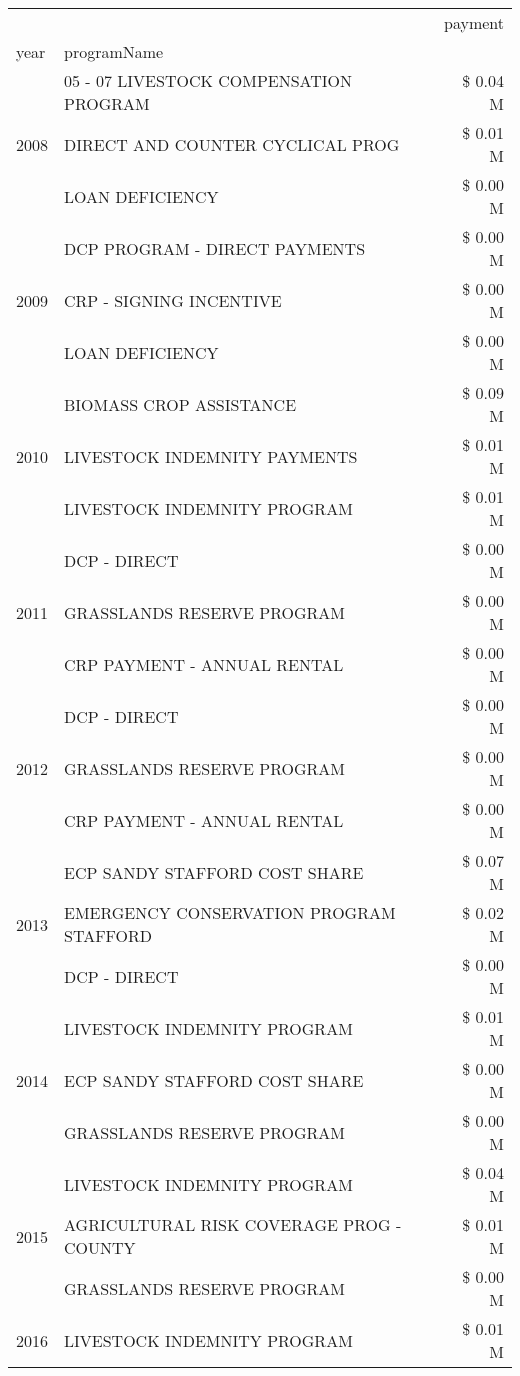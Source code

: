 \begin{tabular}{llr}
\toprule
 &  & payment \\
year & programName &  \\
\midrule
\multirow[t]{3}{*}{2008} & 05 - 07 LIVESTOCK COMPENSATION PROGRAM & \$ 0.04 M \\
 & DIRECT AND COUNTER CYCLICAL PROG & \$ 0.01 M \\
 & LOAN DEFICIENCY & \$ 0.00 M \\
\cline{1-3}
\multirow[t]{3}{*}{2009} & DCP PROGRAM - DIRECT PAYMENTS & \$ 0.00 M \\
 & CRP - SIGNING INCENTIVE & \$ 0.00 M \\
 & LOAN DEFICIENCY & \$ 0.00 M \\
\cline{1-3}
\multirow[t]{3}{*}{2010} & BIOMASS CROP ASSISTANCE & \$ 0.09 M \\
 & LIVESTOCK INDEMNITY PAYMENTS & \$ 0.01 M \\
 & LIVESTOCK INDEMNITY PROGRAM & \$ 0.01 M \\
\cline{1-3}
\multirow[t]{3}{*}{2011} & DCP - DIRECT & \$ 0.00 M \\
 & GRASSLANDS RESERVE PROGRAM & \$ 0.00 M \\
 & CRP PAYMENT - ANNUAL RENTAL & \$ 0.00 M \\
\cline{1-3}
\multirow[t]{3}{*}{2012} & DCP - DIRECT & \$ 0.00 M \\
 & GRASSLANDS RESERVE PROGRAM & \$ 0.00 M \\
 & CRP PAYMENT - ANNUAL RENTAL & \$ 0.00 M \\
\cline{1-3}
\multirow[t]{3}{*}{2013} & ECP SANDY STAFFORD COST SHARE & \$ 0.07 M \\
 & EMERGENCY CONSERVATION PROGRAM STAFFORD & \$ 0.02 M \\
 & DCP - DIRECT & \$ 0.00 M \\
\cline{1-3}
\multirow[t]{3}{*}{2014} & LIVESTOCK INDEMNITY PROGRAM & \$ 0.01 M \\
 & ECP SANDY STAFFORD COST SHARE & \$ 0.00 M \\
 & GRASSLANDS RESERVE PROGRAM & \$ 0.00 M \\
\cline{1-3}
\multirow[t]{3}{*}{2015} & LIVESTOCK INDEMNITY PROGRAM & \$ 0.04 M \\
 & AGRICULTURAL RISK COVERAGE PROG - COUNTY & \$ 0.01 M \\
 & GRASSLANDS RESERVE PROGRAM & \$ 0.00 M \\
\cline{1-3}
\multirow[t]{3}{*}{2016} & LIVESTOCK INDEMNITY PROGRAM & \$ 0.01 M \\

\end{tabular}

